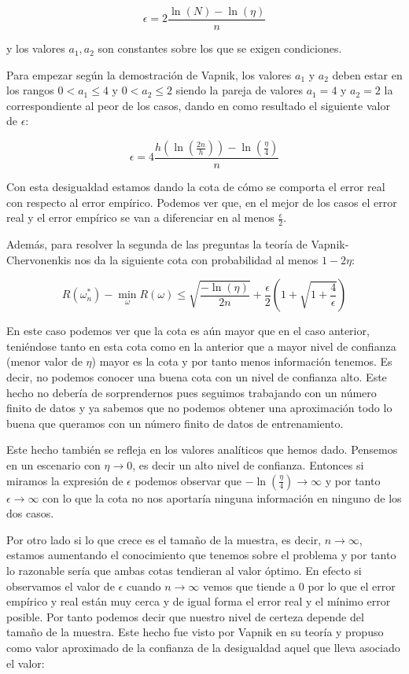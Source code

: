 $$\epsilon = 2\frac{\ln (N) - \ln (\eta)}{n}$$

y los valores $a_1 , a_2$ son constantes sobre los que se exigen condiciones.

Para empezar según la demostración de Vapnik, los valores $a_1$ y $a_2$ deben estar en los rangos $0<a_1 \leq 4$ y $0<a_2 \leq 2$ siendo la pareja de valores $a_1 = 4$ y $a_2 = 2$ la correspondiente al peor de los casos, dando en como resultado el siguiente valor de $\epsilon$:

$$\epsilon = 4\frac{h(\ln (\frac{2n}{h})) - \ln (\frac{\eta}{4})}{n}$$

Con esta desigualdad estamos dando la cota de cómo se comporta el error real con respecto al error empírico. Podemos ver que, en el mejor de los casos el error real y el error empírico se van a diferenciar en al menos $\frac{\epsilon}{2}$.

Además, para resolver la segunda de las preguntas la teoría de Vapnik-Chervonenkis nos da la siguiente cota con probabilidad al menos $1-2\eta$:

$$R(\omega_n^*)-\min_{\omega} R(\omega) \leq \sqrt{\frac{-\ln (\eta)}{2n}} + \frac{\epsilon}{2} \left( 1+\sqrt{1+\frac{4}{\epsilon}} \right)$$

En este caso podemos ver que la cota es aún mayor que en el caso anterior, teniéndose tanto en esta cota como en la anterior que a mayor nivel de confianza (menor valor de $\eta$) mayor es la cota y por tanto menos información tenemos. Es decir, no podemos conocer una buena cota con un nivel de confianza alto. Este hecho no debería de sorprendernos pues seguimos trabajando con un número finito de datos y ya sabemos que no podemos obtener una aproximación todo lo buena que queramos con un número finito de datos de entrenamiento.

Este hecho también se refleja en los valores analíticos que hemos dado. Pensemos en un escenario con $\eta \rightarrow 0$, es decir un alto nivel de confianza. Entonces si miramos la expresión de $\epsilon$ podemos observar que $-\ln (\frac{\eta}{4})\rightarrow \infty$ y por tanto $\epsilon \rightarrow \infty$ con lo que la cota no nos aportaría ninguna información en ninguno de los dos casos.

Por otro lado si lo que crece es el tamaño de la muestra, es decir, $n\rightarrow \infty$, estamos aumentando el conocimiento que tenemos sobre el problema y por tanto lo razonable sería que ambas cotas tendieran al valor óptimo. En efecto si observamos el valor de $\epsilon$ cuando $n\rightarrow \infty$ vemos que tiende a $0$ por lo que el error empírico y real están muy cerca y de igual forma el error real y el mínimo error posible. Por tanto podemos decir que nuestro nivel de certeza depende del tamaño de la muestra. Este hecho fue visto por Vapnik en su teoría y propuso como valor aproximado de la confianza de la desigualdad aquel que lleva asociado el valor:

